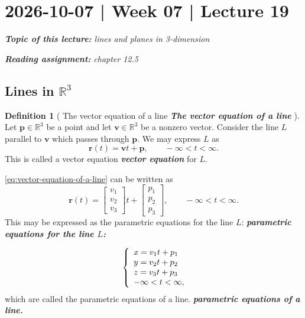 \documentclass[10pt]{article}
\DeclareRobustCommand{\demph}[1]{%
  \ifmmode
  {\color{Blue}#1}%
  \else
  {\color{Blue}\bfseries\slshape #1}%
  \fi
}
\theoremstyle{definition}
\newtheorem{definition}[theorem]{Definition}
\newcommand{\1}[1]{\textbf{1}_{\left[#1\right]}} %
\def\R{\mathbb{R}} %
\begin{document}
\newpage
\section{2026-10-07 | Week 07 | Lecture 19}
\begin{center}
  \begin{tcolorbox}[width=0.9\textwidth, colback=white, colframe=black]
    \textit{\textbf{Topic of this lecture:} lines and planes in 3-dimension}

    \textit{\textbf{Reading assignment:} chapter 12.5}
  \end{tcolorbox}
\end{center}

\subsection{Lines in $\R^{3}$}


\begin{definition}[\demph{The vector equation of a line}]
  \label{def:vector-equation-line}
  Let $\mathbf{p}\in \R^{3}$ be a point and let $\boldsymbol{v}\in \R^{3}$ be
  a nonzero vector. Consider the line $L$ parallel to
  $\boldsymbol{v}$ which passes through $\boldsymbol{p}$. We may express $L$ as
  \begin{equation}\label{eq:vector-equation-of-a-line}
    \boldsymbol{r}(t)=\mathbf{v}t + \mathbf{p}, \qquad -\infty<t<\infty.
  \end{equation}
  This is called a \demph{vector equation} for $L$.
\end{definition}
\cref{eq:vector-equation-of-a-line} can be written as
\begin{equation*}
  \boldsymbol{r}(t)
  =
  \begin{bmatrix}
    v_{1}\\v_{2}\\v_{3}
  \end{bmatrix}
  t
  +
  \begin{bmatrix}
    p_{1}\\p_{2}\\p_{3}
  \end{bmatrix}, \qquad -\infty<t<\infty.
\end{equation*}
This may be expressed as the \demph{parametric equations for the line $L$:}
\begin{equation*}
  \left\{ \begin{array}{l@{}l}
      x=v_{1}t+p_{1}\\
      y=v_{2}t+p_{2}\\
      z=v_{3}t+p_{3}\\
      -\infty<t<\infty,
    \end{array}\right.
\end{equation*}
which are called the \demph{parametric equations of a line.}
\end{document}
